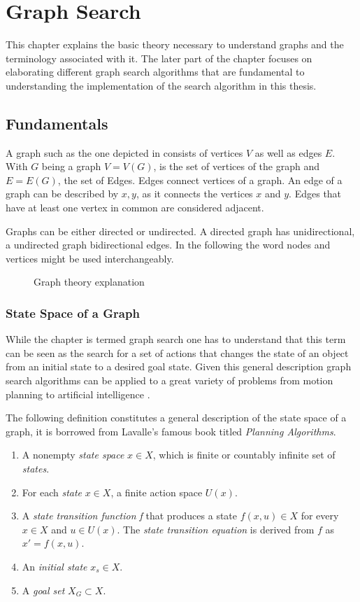 \chapter{Graph Search}
\label{chap:graphSearch}
This chapter explains the basic theory necessary to understand graphs and the terminology associated with it. The later part of the chapter focuses on elaborating different graph search algorithms that are fundamental to understanding the implementation of the search algorithm in this thesis.

\section{Fundamentals}
A graph such as the one depicted in  consists of vertices $V$ as well as edges $E$. With $G$ being a graph $V = V(G)$, is the set of vertices of the graph and $E = E(G)$, the set of Edges. Edges connect vertices of a graph. An edge of a graph can be described by ${x,y}$, as it connects the vertices $x$ and $y$. Edges that have at least one vertex in common are considered adjacent. \cite{Bollobas.1979}

Graphs can be either directed or undirected. A directed graph has unidirectional, a undirected graph bidirectional edges. In the following the word nodes and vertices might be used interchangeably.

\begin{figure}[h]
    \caption{Graph theory explanation}
    \label{fig:graph}
\end{figure}

\subsection{State Space of a Graph}
While the chapter is termed graph search one has to understand that this term can be seen as the search for a set of actions that changes the state of an object from an initial state to a desired goal state. Given this general description graph search algorithms can be applied to a great variety of problems from motion planning to artificial intelligence \cite{LaValle.2006}.

The following definition constitutes a general description of the state space of a graph, it is borrowed from Lavalle's famous book titled \emph{Planning Algorithms}. 

\begin{enumerate}
    \item A nonempty \textit{state space} $x \in X$, which is finite or countably infinite set of \textit{states}.
    \item For each \textit{state} $x \in X$, a finite action space $U(x)$.
    \item A \textit{state transition function f} that produces a state $f(x,u) \in X$ for every $x \in X$ and $u \in U(x)$. The \textit{state transition equation} is derived from $f$ as $x' = f(x,u)$.
    \item An \textit{initial state} $x_s \in X$.
    \item A \textit{goal set} $X_G \subset X$.
\end{enumerate}

